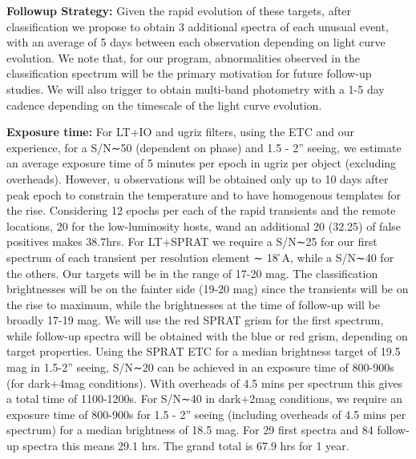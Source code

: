 \documentclass[11pt]{article}
\begin{document}
{\textbf{Followup Strategy:} Given the rapid evolution of these targets, after classification we propose to obtain 3 additional spectra of each unusual event, with an average of 5 days between each observation depending on light curve evolution. We note that, for our program, abnormalities observed in the classification spectrum will be the primary motivation for future follow-up studies. We will also trigger to obtain multi-band photometry with a 1-5 day cadence depending on the timescale of the light curve evolution. 



\textbf{Exposure time:} For LT+IO and ugriz filters, using the ETC and our experience, for a S/N∼50 (dependent
on phase) and 1.5 - 2” seeing, we estimate an average exposure time of 5 minutes per epoch in ugriz per object
(excluding overheads). However, u observations will be obtained only up to 10 days after peak epoch to constrain
the temperature and to have homogenous templates for the rise. Considering 12 epochs per each of the rapid
transients and the remote locations, 20 for the low-luminosity hosts, wand an additional 20%
(32.25) of false positives makes 38.7hrs. For LT+SPRAT we require a S/N∼25 for our first spectrum of each
transient per resolution element ∼ 18 ̊A, while a S/N∼40 for the others. Our targets will be in the range of 17-20
mag. The classification brightnesses will be on the fainter side (19-20 mag) since the transients will be on the
rise to maximum, while the brightnesses at the time of follow-up will be broadly 17-19 mag. We will use the red
SPRAT grism for the first spectrum, while follow-up spectra will be obtained with the blue or red grism, depending
on target properties. Using the SPRAT ETC for a median brightness target of 19.5 mag in 1.5-2” seeing, S/N∼20
can be achieved in an exposure time of 800-900s (for dark+4mag conditions). With overheads of 4.5 mins per
spectrum this gives a total time of 1100-1200s. For S/N∼40 in dark+2mag conditions, we require an exposure
time of 800-900s for 1.5 - 2” seeing (including overheads of 4.5 mins per spectrum) for a median brightness of 18.5
mag. For 29 first spectra and 84 follow-up spectra this means 29.1 hrs. The grand total is 67.9 hrs for 1 year.
}




%
%	
%
 
 \frontpage  
 \pagebreak
 \pagebreak
 \secondpage 
 \pagebreak
 \thirdpage  
 \pagebreak
 \fourthpage 
 \pagebreak
 \fifthpage  
 \pagebreak
\end{document}
